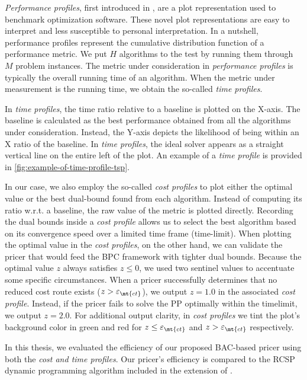 \textit{Performance profiles}, first introduced in \textcite{dolan2002},
are a plot representation used to benchmark optimization software.
These novel plot representations are easy to interpret and less susceptible to personal interpretation.
In a nutshell, performance profiles represent the cumulative distribution function of a performance metric.
We put $H$ algorithms to the test by running them through $M$ problem instances.
The metric under consideration in \textit{performance profiles}
is typically the overall running time of an algorithm.
When the metric under measurement is the running time, we obtain the so-called \textit{time profiles}.

In \textit{time profiles}, the time ratio relative to a baseline is plotted on the X-axis.
The baseline is calculated as the best performance obtained from all the algorithms under consideration.
Instead, the Y-axis depicts the likelihood of being within an X ratio of the baseline.
In \textit{time profiles}, the ideal solver appears as a straight vertical line on the entire left of the plot.
An example of a \textit{time profile} is provided in \cref{fig:example-of-time-profile-tsp}.

In our case, we also employ the so-called \textit{cost profiles} to plot either the optimal value
or the best dual-bound found from each algorithm.
Instead of computing its ratio w.r.t. a baseline, the raw value of the metric is plotted directly.
Recording the dual bounds inside a \textit{cost profile}
allows us to select the best algorithm
based on its convergence speed over a limited time frame (time-limit).
When plotting the optimal value in the \textit{cost profiles}, on the other hand,
we can validate the pricer that would feed the BPC framework with tighter dual bounds.
Because the optimal value $z$ always satisfies $z \le 0$,
we used two sentinel values to accentuate some specific circumstances.
When a pricer successfully determines that no reduced cost route exists
($z > \varepsilon_{\mt{ct}}$),
we output $z = 1.0$ in the associated \textit{cost profile}.
Instead, if the pricer fails to solve the PP optimally within the timelimit,
we output $z = 2.0$.
For additional output clarity, in \textit{cost profiles} we tint
the plot's background color in green and red for $z \le \varepsilon_{\mt{ct}}$ and $z > \varepsilon_{\mt{ct}}$ respectively.

\medskip

In this thesis, we evaluated the efficiency of our proposed BAC-based pricer
using both the \textit{cost and time profiles}.
Our pricer's efficiency is compared to the RCSP dynamic programming algorithm
included in the \vrpsolver{} extension \parencite{pessoa2020generic} of \bapcod{}.


